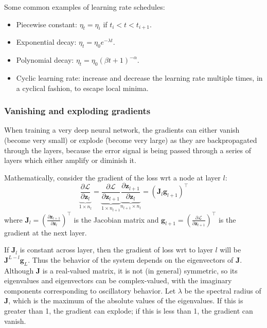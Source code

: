 \documentclass[11pt]{article}
\begin{document}
Some common examples of learning rate schedules:
\begin{itemize}
    \item Piecewise constant: $\eta_t = \eta_i$ if $t_i < t < t_{i+1}$.
    \item Exponential decay: $\eta_t = \eta_0 e^{-\lambda t}$.
    \item Polynomial decay: $\eta_t = \eta_0 (\beta t + 1)^{-\alpha}$. 
    \item Cyclic learning rate: increase and decrease the learning rate multiple times, in a cyclical fashion, to escape local minima.
\end{itemize}

\subsubsection{Vanishing and exploding gradients}
When training a very deep neural network, the gradients can either vanish (become very small) or explode (become very large) as they are backpropagated through the layers, because the error signal is being passed through a series of layers which either amplify or diminish it.

Mathematically, consider the gradient of the loss wrt a node at layer $l$:
\[
\underbrace{\frac{\partial \mathcal{L}}{\partial \boldsymbol{z}_l}}_{1 \times n_l} = \underbrace{\frac{\partial \mathcal{L}}{\partial \boldsymbol{z}_{l+1}}}_{1 \times n_{l+1}} \underbrace{\frac{\partial \boldsymbol{z}_{l+1}}{\partial \boldsymbol{z}_l}}_{n_{l+1} \times n_l} = \left( \mathbf{J}_l \boldsymbol{g}_{l+1} \right)^\top
\]
where $\mathbf{J}_l = \left(\frac{\partial \boldsymbol{z}_{l+1}}{\partial \boldsymbol{z}_l}\right)^\top$ is the Jacobian matrix and $\boldsymbol{g}_{l+1} =\left( \frac{\partial \mathcal{L}}{\partial \boldsymbol{z}_{l+1}}\right) ^\top$ is the gradient at the next layer.

If $\mathbf{J}_l$ is constant across layer, then the gradient of loss wrt to layer $l$ will be $\mathbf{J}^{L - l} \boldsymbol{g}_L$. Thus the behavior of the system depends on the eigenvectors of $\mathbf{J}$.
Although $\mathbf{J}$ is a real-valued matrix, it is not (in general) symmetric, so its eigenvalues and eigenvectors can be complex-valued, with the imaginary components corresponding to oscillatory behavior. 
Let $\lambda$ be the spectral radius of $\mathbf{J}$, which is the maximum of the absolute values of the eigenvalues. If this is greater than 1, the gradient can explode; if this is less than 1, the gradient can vanish.
\end{document}
